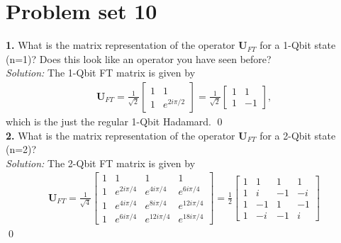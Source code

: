 \documentclass{book}
\theoremstyle{definition}
\newcommand{\f}[2]{\frac{#1}{#2}}
\newcommand{\U}{\mathbf{U}}
\begin{document}
\newpage





\section{Problem set 10}



\noindent \textbf{1.} What is the matrix representation of the operator $\U_{FT}$ for a 1-Qbit state (n=1)? Does this look like an operator you have seen before?\\

\noindent \textit{Solution:} The 1-Qbit FT matrix is given by
\begin{align}
\U_{FT} = \f{1}{\sqrt{2}}\begin{bmatrix}
1 & 1 \\
1 & e^{2i\pi/2} 
\end{bmatrix} = \f{1}{\sqrt{2}}\begin{bmatrix}
1 & 1 \\ 1 & -1
\end{bmatrix},
\end{align}
which is the just the regular 1-Qbit Hadamard. \qed\\


\noindent \textbf{2.} What is the matrix representation of the operator $\U_{FT}$ for a 2-Qbit state (n=2)?\\


\noindent \textit{Solution:} The 2-Qbit FT matrix is given by
\begin{align}
\U_{FT} = \f{1}{\sqrt{4}}\begin{bmatrix}
1 & 1 & 1 & 1\\
1 & e^{2i\pi/4} & e^{4i\pi/4} & e^{6i\pi/4} \\
1 & e^{4i\pi/4} & e^{8i\pi/4} & e^{12i\pi/4} \\
1 & e^{6i\pi/4} & e^{12i\pi/4} & e^{18i\pi/4}
\end{bmatrix} 
=
\f{1}{2}\begin{bmatrix}
1 & 1 & 1 & 1\\
1 & i & -1 & -i \\
1 & -1 & 1 & -1 \\
1 & -i & -1 & i
\end{bmatrix}
\end{align} 
\qed\\
\end{document}
